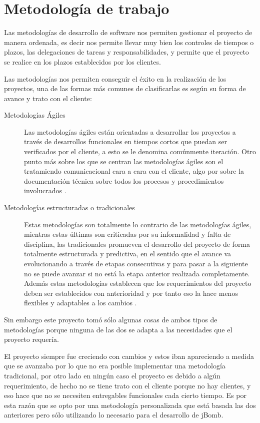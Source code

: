 \documentclass[a4paper,12pt,openany,oneside]{book}
\begin{document}
\chapter{Metodología de trabajo}
Las metodologías de desarrollo de software nos permiten gestionar el proyecto de manera ordenada, es decir nos permite llevar muy bien los controles de tiempos o plazos, las delegaciones de tareas y responsabilidades, y permite que el proyecto se realice en los plazos establecidos por los clientes.

Las metodologías nos permiten conseguir el éxito en la realización de los proyectos, una de las formas más comunes de clasificarlas es según su forma de avance y trato con el cliente:
\begin{description}
\item[Metodologías Ágiles] Las metodologías ágiles están orientadas a desarrollar los proyectos a través de desarrollos funcionales en tiempos cortos que puedan ser verificados por el cliente, a esto se le denomina comúnmente iteración. Otro punto más sobre los que se centran las metodologías ágiles son el tratamiendo comunicacional cara a cara con el cliente, algo por sobre la documentación técnica sobre todos los procesos y procedimientos involucrados \cite{WIKIDS}.
\item[Metodologías estructuradas o tradicionales] Estas metodologías son totalmente lo contrario de las metodologías ágiles, mientras estas últimas son criticadas por su informalidad y falta de disciplina, las tradicionales promueven el desarrollo del proyecto de forma totalmente estructurada y predictiva, en el sentido que el avance va evolucionando a través de etapas consecutivas y para pasar a la siguiente no se puede avanzar si no está la etapa anterior realizada completamente. Además estas metodologías establecen que los requerimientos del proyecto deben ser establecidos con anterioridad y por tanto eso la hace menos flexibles y adaptables a los cambios \cite{WIKIDS}.
\end{description}
Sin embargo este proyecto tomó sólo algunas cosas de ambos tipos de metodologías porque ninguna de las dos se adapta a las necesidades que el proyecto requería. 

El proyecto siempre fue creciendo con cambios y estos iban apareciendo a medida que se avanzaba por lo que no era posible implementar una metodología tradicional, por otro lado en ningún caso el proyecto es debido a algún requerimiento, de hecho no se tiene trato con el cliente porque no hay clientes, y eso hace que no se necesiten entregables funcionales cada cierto tiempo. Es por esta razón que se opto por una metodología personalizada que está basada las dos anteriores pero sólo utilizando lo necesario para el desarrollo de jBomb.
\end{document}
